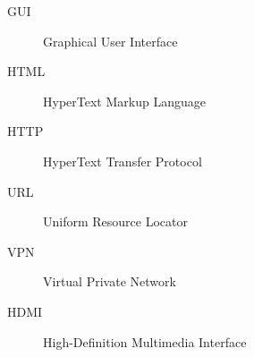 
\begin{description}
    \item [GUI] Graphical User Interface
    \item [HTML] HyperText Markup Language
    \item [HTTP] HyperText Transfer Protocol
    \item [URL] Uniform Resource Locator
    \item [VPN] Virtual Private Network
    \item [HDMI] High-Definition Multimedia Interface
\end{description}

